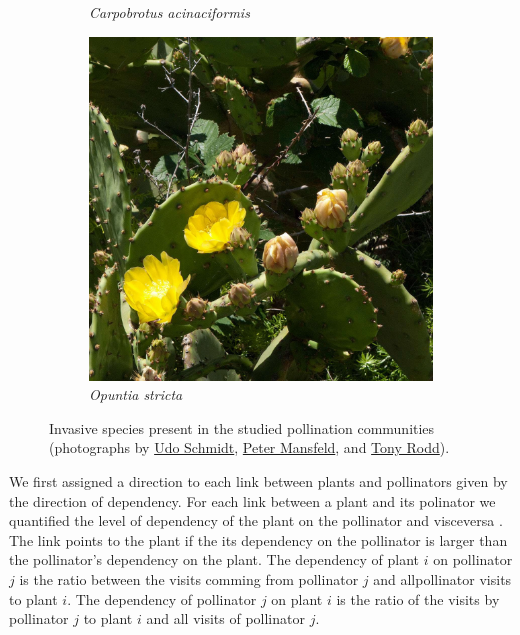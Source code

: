 \documentclass[a4paper]{article}
\begin{document}
\begin{figure}
\begin{subfigure}{0.3\textwidth}
        \caption{\textit{Carpobrotus acinaciformis}}
    \end{subfigure}
    \hfill
    \begin{subfigure}{0.3\textwidth}
        \centering
        \includegraphics[width=\textwidth]{Opuntia_stricta}
        \caption{\textit{Opuntia stricta}}
    \end{subfigure}
    \hfill
    \caption{
    Invasive species present in the studied pollination communities (photographs by \href{https://commons.wikimedia.org/wiki/File:Impatiens_glandulifera_Royle_(7677070626).jpg}{Udo Schmidt}, \href{https://commons.wikimedia.org/wiki/File:Carpobrotus_acinaciformis_pm.jpg}{Peter Mansfeld}, and \href{https://www.flickr.com/photos/tony_rodd/5265326818}{Tony Rodd}).
    }
    \label{fig:photographs}
\end{figure} 

We first assigned a direction to each link between plants and pollinators given by the direction of dependency. For each link between a plant and its polinator we quantified the level of dependency of the plant on the pollinator and visceversa \autocite{Bascompte2006}. The link points to the plant if the its dependency on the pollinator is larger than the pollinator's dependency on the plant. The dependency of plant $i$ on pollinator $j$ is the ratio between the visits comming from pollinator $j$ and allpollinator visits to plant $i$. The dependency of pollinator $j$ on plant $i$ is the ratio of the visits by pollinator $j$ to plant $i$ and all visits of pollinator $j$. 
\end{document}
